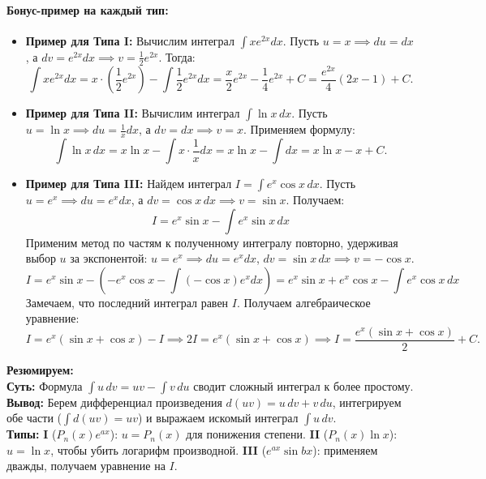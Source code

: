 \paragraph{Бонус-пример на каждый тип:}
\begin{itemize}
    \item \textbf{Пример для Типа I:} Вычислим интеграл $\int x e^{2x} dx$. Пусть $u = x \implies du = dx$, а $dv = e^{2x} dx \implies v = \frac{1}{2}e^{2x}$. Тогда:
    $$ \int x e^{2x} dx = x \cdot \left(\frac{1}{2}e^{2x}\right) - \int \frac{1}{2}e^{2x} dx = \frac{x}{2}e^{2x} - \frac{1}{4}e^{2x} + C = \frac{e^{2x}}{4}(2x - 1) + C. $$
    
    \item \textbf{Пример для Типа II:} Вычислим интеграл $\int \ln x \, dx$. Пусть $u = \ln x \implies du = \frac{1}{x}dx$, а $dv = dx \implies v = x$. Применяем формулу:
    $$ \int \ln x \, dx = x \ln x - \int x \cdot \frac{1}{x} dx = x \ln x - \int dx = x \ln x - x + C. $$
    
    \item \textbf{Пример для Типа III:} Найдем интеграл $I = \int e^x \cos x \, dx$. Пусть $u = e^x \implies du = e^x dx$, а $dv = \cos x \, dx \implies v = \sin x$. Получаем:
    $$ I = e^x \sin x - \int e^x \sin x \, dx $$
    Применим метод по частям к полученному интегралу повторно, удерживая выбор $u$ за экспонентой: $u = e^x \implies du = e^x dx$, $dv = \sin x \, dx \implies v = -\cos x$.
    $$ I = e^x \sin x - \left( -e^x \cos x - \int (-\cos x) e^x dx \right) = e^x \sin x + e^x \cos x - \int e^x \cos x \, dx $$
    Замечаем, что последний интеграл равен $I$. Получаем алгебраическое уравнение:
    $$ I = e^x(\sin x + \cos x) - I \implies 2I = e^x(\sin x + \cos x) \implies I = \frac{e^x(\sin x + \cos x)}{2} + C. $$
\end{itemize}


\begin{tcolorbox}[colback=gray!5, colframe=black, boxrule=0.5pt, arc=0pt]
\textbf{Резюмируем:} \\
\textbf{Суть:} Формула $\int u\,dv=uv-\int v\,du$ сводит сложный интеграл к более простому. \\
\textbf{Вывод:} Берем дифференциал произведения $d(uv)=u\,dv+v\,du$, интегрируем обе части ($\int d(uv)=uv$) и выражаем искомый интеграл $\int u\,dv$. \\
\textbf{Типы:} \textbf{I} ($P_n(x)e^{ax}$): $u=P_n(x)$ для понижения степени. \textbf{II} ($P_n(x)\ln x$): $u=\ln x$, чтобы убить логарифм производной. \textbf{III} ($e^{ax}\sin bx$): применяем дважды, получаем уравнение на $I$.
\end{tcolorbox}




